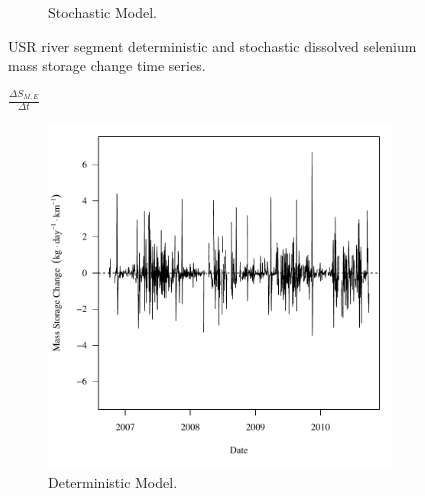 \begin{landscape}
\begin{figure}
\begin{subfigure}{0.7\textwidth}
			\caption{Stochastic Model.}
		\end{subfigure}
		\caption{USR river segment deterministic and stochastic dissolved selenium mass storage change time series.}
	\end{figure}
\end{landscape}

\subfiguremid
\begin{landscape}
	\begin{figure}
		$ \displaystyle \frac{\Delta S_{M,E}}{\Delta t} $
		\begin{subfigure}{0.7\textwidth}
			\centering
			\includegraphics[width=\tableCustomSize]{"Figures/Results_USR/Deterministic/f Segment E"}
			\caption{Deterministic Model.}
		\end{subfigure}%
		\begin{subfigure}{0.7\textwidth}
			\centering

\end{subfigure}
\end{figure}
\end{landscape}
